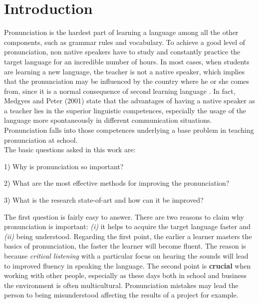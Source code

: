 
\chapter{Introduction}
\label{ch:introduction}
Pronunciation is the hardest part of learning a language among all the other components, such as grammar rules and vocabulary. To achieve a good level of pronunciation, non native speakers have to study and constantly practice the target language for an incredible number of hours. In most cases, when students are learning a new language, the teacher is not a native speaker, which implies that the pronunciation may be influenced by the country where he or she comes from, since it is a normal consequence of second learning language \cite{derwing2005second}. In fact, Medgyes and Peter (2001) state that the advantages of having a native speaker as a teacher lies in the superior linguistic competences, especially the usage of the language more spontaneously in different communication situations. Pronunciation falls into those competences underlying a base problem in teaching pronunciation at school. \\
\noindent The basic questions asked in this work are:
\begin{compactitem}
    \item[1)] Why is pronunciation so important?
    \item[2)] What are the most effective methods for improving the pronunciation?
    \item[3)] What is the research state-of-art and how can it be improved?
\end{compactitem}

\vspace*{1em}

\noindent The first question is fairly easy to answer. There are two reasons to claim why pronunciation is important: \textit{(i)} it helps to acquire the target language faster and \textit{(ii)} being understood.
Regarding the first point, the earlier a learner masters the basics of pronunciation, the faster the learner will become fluent. The reason is because \textit{critical listening} with a particular focus on hearing the sounds will lead to improved fluency in speaking the language.
The second point is \textbf{crucial} when working with other people, especially as these days both in school and business the environment is often multicultural. Pronunciation mistakes may lead the person to being misunderstood affecting the results of a project for example. \\

